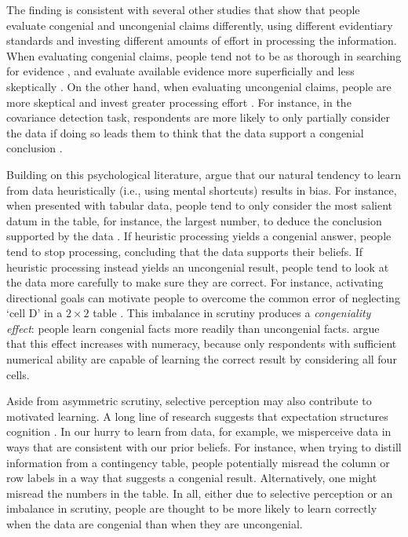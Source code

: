 \documentclass[12pt, letterpaper]{article}
\begin{document}
The finding is consistent with several other studies that show that people evaluate congenial and uncongenial claims differently, using different evidentiary standards and investing different amounts of effort in processing the information. When evaluating congenial claims, people tend not to be as thorough in searching for evidence \citep[e.g.,][]{kruglanksi1996, nickerson1998}, and evaluate available evidence more superficially and less skeptically \citep[e.g.,][]{chaiken1994}. On the other hand, when evaluating uncongenial claims, people are more skeptical and invest greater processing effort \citep[e.g.,][]{ditto1992, ditto1998, dawson2002}.  For instance, in the covariance detection task, respondents are more likely to only partially consider the data if doing so leads them to think that the data support a congenial conclusion \citep{dawson2002cella}. 

Building on this psychological literature, \citet{kahan2017} argue that our natural tendency to learn from data heuristically (i.e., using mental shortcuts) results in bias. For instance, when presented with tabular data, people tend to only consider the most salient datum in the table, for instance, the largest number, to deduce the conclusion supported by the data \citep[][p. 31]{gilovich1991}. If heuristic processing yields a congenial answer, people tend to stop processing, concluding that the data supports their beliefs. If heuristic processing instead yields an uncongenial result, people tend to look at the data more carefully to make sure they are correct. For instance, activating directional goals can motivate people to overcome the common error of neglecting `cell D' in a $2 \times 2$ table \citep{mata2015a, mata2015b}. This imbalance in scrutiny produces a {\it congeniality effect}: people learn congenial facts more readily than uncongenial facts. \citeauthor{kahan2017} argue that this effect increases with numeracy, because only respondents with sufficient numerical ability are capable of learning the correct result by considering all four cells.

Aside from asymmetric scrutiny, selective perception may also contribute to motivated learning. A long line of research suggests that expectation structures cognition \citep{hastorf1954, bechlivanidis2013, kahneman2013}. In our hurry to learn from data, for example, we misperceive data in ways that are consistent with our prior beliefs. For instance, when trying to distill information from a contingency table, people potentially misread the column or row labels in a way that suggests a congenial result. Alternatively, one might misread the numbers in the table. In all, either due to selective perception or an imbalance in scrutiny, people are thought to be more likely to learn correctly when the data are congenial than when they are uncongenial.
\end{document}
